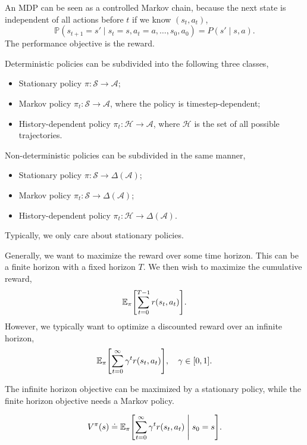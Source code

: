 An MDP can be seen as a controlled Markov chain, because the next state is independent of all
actions before $t$ if we know $(s_t,a_t)$, \[
    \mathbb{P}(s_{t+1} = s' \mid s_t = s, a_t = a, \ldots, s_0, a_0) = P(s' \mid s, a).
\]
The performance objective is the reward.

Deterministic policies can be subdivided into the following three classes,
\begin{itemize}
    \item Stationary policy $\pi: \mathcal{S} \to \mathcal{A}$;
    \item Markov policy $\pi_t: \mathcal{S} \to \mathcal{A}$, where the policy is timestep-dependent;
    \item History-dependent policy $\pi_t: \mathcal{H} \to \mathcal{A}$, where $\mathcal{H}$ is the set of
          all possible trajectories.
\end{itemize}

Non-deterministic policies can be subdivided in the same manner,
\begin{itemize}
    \item Stationary policy $\pi: \mathcal{S} \to \Delta(\mathcal{A})$;
    \item Markov policy $\pi_t: \mathcal{S} \to \Delta(\mathcal{A})$;
    \item History-dependent policy $\pi_t: \mathcal{H} \to \Delta(\mathcal{A})$.
\end{itemize}

Typically, we only care about stationary policies.

Generally, we want to maximize the reward over some time horizon. This can be a finite horizon with
a fixed horizon $T$. We then wish to maximize the cumulative reward, \[
    \E_\pi \lft[ \sum_{t=0}^{T-1} r(s_t,a_t) \rgt].
\]
However, we typically want to optimize a discounted reward over an infinite horizon, \[
    \E_\pi \lft[ \sum_{t=0}^{\infty} \gamma^t r(s_t,a_t) \rgt], \quad \gamma \in [0,1].
\]

\begin{remark}
    The infinite horizon objective can be maximized by a stationary policy, while the finite horizon
    objective needs a Markov policy.
\end{remark}

\begin{definition}
    \[
        V^\pi(s) \doteq \E_\pi \lft[ \sum_{t=0}^{\infty} \gamma^t r(s_t,a_t) \;\middle|\; s_0 = s \rgt].
    \]
\end{definition}

